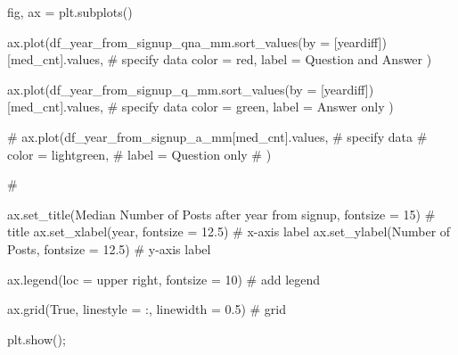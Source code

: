 \documentclass[
  letterpaper,
  DIV=11,
  numbers=noendperiod]{scrartcl}
\newenvironment{Shaded}{\begin{snugshade}}{\end{snugshade}}
\newcommand{\CommentTok}[1]{\textcolor[rgb]{0.37,0.37,0.37}{#1}}
\newcommand{\DecValTok}[1]{\textcolor[rgb]{0.68,0.00,0.00}{#1}}
\newcommand{\FloatTok}[1]{\textcolor[rgb]{0.68,0.00,0.00}{#1}}
\newcommand{\NormalTok}[1]{\textcolor[rgb]{0.00,0.23,0.31}{#1}}
\newcommand{\OperatorTok}[1]{\textcolor[rgb]{0.37,0.37,0.37}{#1}}
\newcommand{\StringTok}[1]{\textcolor[rgb]{0.13,0.47,0.30}{#1}}
\newcommand{\VariableTok}[1]{\textcolor[rgb]{0.07,0.07,0.07}{#1}}
\begin{document}
\begin{Shaded}
\begin{Highlighting}[]
\NormalTok{fig, ax }\OperatorTok{=}\NormalTok{ plt.subplots()}


\NormalTok{ax.plot(df\_year\_from\_signup\_qna\_mm.sort\_values(by }\OperatorTok{=}\NormalTok{ [}\StringTok{\textquotesingle{}yeardiff\textquotesingle{}}\NormalTok{])[}\StringTok{\textquotesingle{}med\_cnt\textquotesingle{}}\NormalTok{].values, }\CommentTok{\# specify data}
\NormalTok{        color }\OperatorTok{=} \StringTok{\textquotesingle{}red\textquotesingle{}}\NormalTok{,}
\NormalTok{        label }\OperatorTok{=} \StringTok{\textquotesingle{}Question and Answer\textquotesingle{}}
\NormalTok{) }


\NormalTok{ax.plot(df\_year\_from\_signup\_q\_mm.sort\_values(by }\OperatorTok{=}\NormalTok{ [}\StringTok{\textquotesingle{}yeardiff\textquotesingle{}}\NormalTok{])[}\StringTok{\textquotesingle{}med\_cnt\textquotesingle{}}\NormalTok{].values, }\CommentTok{\# specify data}
\NormalTok{        color }\OperatorTok{=} \StringTok{\textquotesingle{}green\textquotesingle{}}\NormalTok{,}
\NormalTok{        label }\OperatorTok{=} \StringTok{\textquotesingle{}Answer only\textquotesingle{}}
\NormalTok{) }

\CommentTok{\# ax.plot(df\_year\_from\_signup\_a\_mm[\textquotesingle{}med\_cnt\textquotesingle{}].values, \# specify data}
\CommentTok{\#         color = \textquotesingle{}lightgreen\textquotesingle{},}
\CommentTok{\#         label = \textquotesingle{}Question only\textquotesingle{}}
\CommentTok{\# ) }

\CommentTok{\# }

\NormalTok{ax.set\_title(}\StringTok{\textquotesingle{}Median Number of Posts after year from signup\textquotesingle{}}\NormalTok{, fontsize }\OperatorTok{=} \DecValTok{15}\NormalTok{) }\CommentTok{\# title}
\NormalTok{ax.set\_xlabel(}\StringTok{\textquotesingle{}year\textquotesingle{}}\NormalTok{, fontsize }\OperatorTok{=} \FloatTok{12.5}\NormalTok{) }\CommentTok{\# x{-}axis label}
\NormalTok{ax.set\_ylabel(}\StringTok{\textquotesingle{}Number of Posts\textquotesingle{}}\NormalTok{, fontsize }\OperatorTok{=} \FloatTok{12.5}\NormalTok{) }\CommentTok{\# y{-}axis label}

\NormalTok{ax.legend(loc }\OperatorTok{=} \StringTok{\textquotesingle{}upper right\textquotesingle{}}\NormalTok{, fontsize }\OperatorTok{=} \DecValTok{10}\NormalTok{) }\CommentTok{\# add legend}

\NormalTok{ax.grid(}\VariableTok{True}\NormalTok{, linestyle }\OperatorTok{=} \StringTok{\textquotesingle{}:\textquotesingle{}}\NormalTok{, linewidth }\OperatorTok{=} \FloatTok{0.5}\NormalTok{) }\CommentTok{\# grid}

\NormalTok{plt.show()}\OperatorTok{;}
\end{Highlighting}
\end{Shaded}
\end{document}
